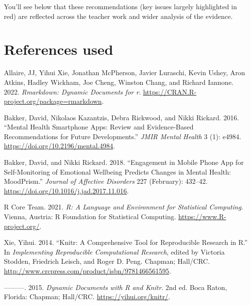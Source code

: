 \documentclass[
]{book}
\newlength{\cslhangindent}
\newlength{\cslentryspacingunit} %
\newenvironment{CSLReferences}[2] %
 {%
  \setlength{\parindent}{0pt}
  \ifodd #1
  \let\oldpar\par
  \def\par{\hangindent=\cslhangindent\oldpar}
  \fi
  \setlength{\parskip}{#2\cslentryspacingunit}
 }%
 {}
\begin{document}
You'll see below that these recommendations (key issues largely highlighted in red) are reflected across the teacher work and wider analysis of the evidence.

\label{fig:synthesis-recommendations}

\hypertarget{references-used}{%
\chapter{References used}\label{references-used}}

\hypertarget{refs}{}
\begin{CSLReferences}{1}{0}
\leavevmode{}%
Allaire, JJ, Yihui Xie, Jonathan McPherson, Javier Luraschi, Kevin Ushey, Aron Atkins, Hadley Wickham, Joe Cheng, Winston Chang, and Richard Iannone. 2022. \emph{Rmarkdown: Dynamic Documents for r}. \url{https://CRAN.R-project.org/package=rmarkdown}.

\leavevmode{}%
Bakker, David, Nikolaos Kazantzis, Debra Rickwood, and Nikki Rickard. 2016. {``Mental {Health Smartphone Apps}: {Review} and {Evidence-Based Recommendations} for {Future Developments}.''} \emph{JMIR Mental Health} 3 (1): e4984. \url{https://doi.org/10.2196/mental.4984}.

\leavevmode{}%
Bakker, David, and Nikki Rickard. 2018. {``Engagement in Mobile Phone App for Self-Monitoring of Emotional Wellbeing Predicts Changes in Mental Health: {MoodPrism}.''} \emph{Journal of Affective Disorders} 227 (February): 432--42. \url{https://doi.org/10.1016/j.jad.2017.11.016}.

\leavevmode{}%
R Core Team. 2021. \emph{R: A Language and Environment for Statistical Computing}. Vienna, Austria: R Foundation for Statistical Computing. \url{https://www.R-project.org/}.

\leavevmode{}%
Xie, Yihui. 2014. {``Knitr: A Comprehensive Tool for Reproducible Research in {R}.''} In \emph{Implementing Reproducible Computational Research}, edited by Victoria Stodden, Friedrich Leisch, and Roger D. Peng. Chapman; Hall/CRC. \url{http://www.crcpress.com/product/isbn/9781466561595}.

\leavevmode{}%
---------. 2015. \emph{Dynamic Documents with {R} and Knitr}. 2nd ed. Boca Raton, Florida: Chapman; Hall/CRC. \url{https://yihui.org/knitr/}.


\end{CSLReferences}
\end{document}

